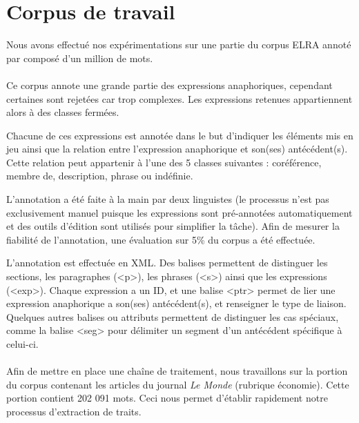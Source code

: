\documentclass[a4paper,12pt]{article}
\begin{document}

\section{Corpus de travail}
\label{corpus}

Nous avons effectué nos expérimentations sur une partie du corpus ELRA annoté par \citet{tutin-hal-00373327} composé d'un million de mots.


\paragraph{}
Ce corpus annote une grande partie des expressions anaphoriques, cependant certaines sont rejetées car trop complexes. Les expressions retenues appartiennent alors à des classes fermées.

Chacune de ces expressions est annotée dans le but d'indiquer les éléments mis en jeu ainsi que la relation entre l'expression anaphorique et son(ses) antécédent(s). Cette relation peut appartenir à l'une des 5 classes suivantes : coréférence, membre de, description, phrase ou indéfinie.

L'annotation a été faite à la main par deux linguistes (le processus n'est pas exclusivement manuel puisque les expressions sont pré-annotées automatiquement et des outils d'édition sont utilisés pour simplifier la tâche). Afin de mesurer la fiabilité de l'annotation, une évaluation sur 5\% du corpus a été effectuée.

L'annotation est effectuée en XML. Des balises permettent de distinguer les sections, les paragraphes (<p>), les phrases (<s>) ainsi que les expressions (<exp>). Chaque expression a un ID, et une balise <ptr> permet de lier une expression anaphorique a son(ses) antécédent(s), et renseigner le type de liaison. Quelques autres balises ou attributs permettent de distinguer les cas spéciaux, comme la balise <seg> pour délimiter un segment d'un antécédent spécifique à celui-ci.



\paragraph{}
Afin de mettre en place une chaîne de traitement, nous travaillons sur la portion du corpus contenant les articles du journal \emph{Le Monde} (rubrique économie). Cette portion contient 202 091 mots. Ceci nous permet d'établir rapidement notre processus d'extraction de traits.
\end{document}
